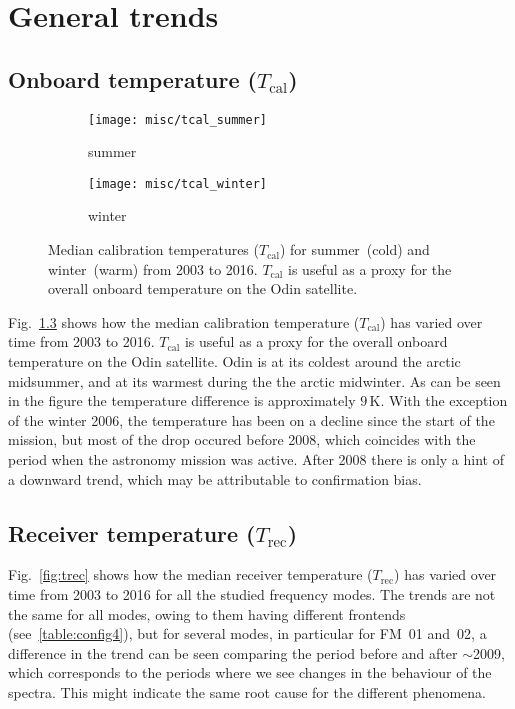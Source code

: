 \chapter{General trends}
\label{ch:general}

\section{Onboard temperature ($T_\mathrm{cal}$)}
\label{sec:Tcal}

\begin{figure}[ht]
    \centering
    \begin{subfigure}[b]{0.9545\textwidth}
        \texttt{[image: misc/tcal\_summer]}
        \caption{summer}\label{fig:tcal:summer}
    \end{subfigure}
    \begin{subfigure}[b]{0.9545\textwidth}
        \texttt{[image: misc/tcal\_winter]}
        \caption{winter}\label{fig:tcal:winter}
    \end{subfigure}
    \caption{Median calibration temperatures ($T_\mathrm{cal}$) for
        summer~(cold) and winter~(warm) from 2003 to 2016. $T_\mathrm{cal}$ is
        useful as a proxy for the overall onboard temperature on the Odin
        satellite.}\label{fig:tcal}
\end{figure}

\noindent
Fig.~\ref{fig:tcal} shows how the median calibration temperature
($T_\mathrm{cal}$) has varied over time from 2003 to 2016.  $T_\mathrm{cal}$ is
useful as a proxy for the overall onboard temperature on the Odin satellite.
Odin is at its coldest around the arctic midsummer, and at its warmest during
the the arctic midwinter.  As can be seen in the figure the temperature
difference is approximately $9\,\mathrm{K}$.  With the exception of the
winter 2006, the temperature has been on a decline since the start of the
mission, but most of the drop occured before 2008, which coincides with the
period when the astronomy mission was active.  After 2008 there is only a hint
of a downward trend, which may be attributable to confirmation bias.


\section{Receiver temperature ($T_\mathrm{rec}$)}
\label{sec:Trec}
Fig.~\ref{fig:trec} shows how the median receiver temperature
($T_\mathrm{rec}$) has varied over time from 2003 to 2016 for all the studied
frequency modes.  The trends are not the same for all modes, owing to them
having different frontends (see~\ref{table:config4}), but for several modes,
in particular for FM~01 and~02, a difference in the trend can be seen comparing
the period before and after $\sim$2009, which corresponds to the periods where
we see changes in the behaviour of the spectra.  This might indicate the same
root cause for the different phenomena.

